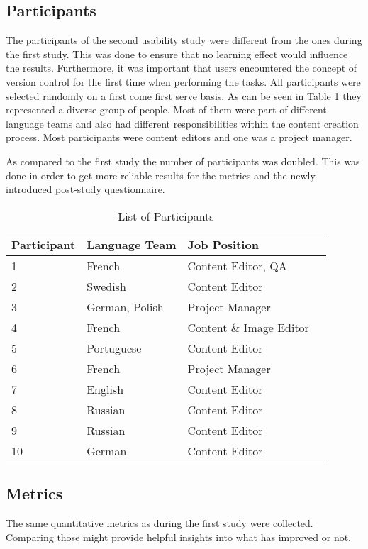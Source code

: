 \subsection{Participants}
The participants of the second usability study were different from the ones during the first study. This was done to ensure that no learning effect would influence the results. Furthermore, it was important that users encountered the concept of version control for the first time when performing the tasks. All participants were selected randomly on a first come first serve basis. As can be seen in Table \ref{table:participants-study2} they represented a diverse group of people. Most of them were part of different language teams and also had different responsibilities within the content creation process. Most participants were content editors and one was a project manager.

As compared to the first study the number of participants was doubled. This was done in order to get more reliable results for the metrics and the newly introduced post-study questionnaire.

\begin{table}[h!]
\centering
\begin{tabular}{|l|l|l|l|}
\hline
\rowcolor[HTML]{EFEFEF}
{\bf Participant} & {\bf Language Team} & {\bf Job Position} \\ \hline
1 & French & Content Editor, QA \\ \hline
2 & Swedish & Content Editor \\ \hline
3 & German, Polish & Project Manager \\ \hline
4 & French & Content \& Image Editor \\ \hline
5 & Portuguese & Content Editor \\ \hline
6 & French & Project Manager \\ \hline
7 & English & Content Editor \\ \hline
8 & Russian & Content Editor \\ \hline
9 & Russian & Content Editor \\ \hline
10 & German & Content Editor \\ \hline
\end{tabular}
\caption{List of Participants}
\label{table:participants-study2}
\end{table}


\subsection{Metrics}
The same quantitative metrics as during the first study were collected. Comparing those might provide helpful insights into what has improved or not.

